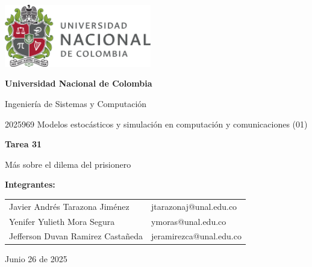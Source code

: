 \documentclass{article}
\begin{document}
\begin{titlepage}
    \centering
    \includegraphics[width=0.48\textwidth]{diagrams/logo_universidad.png}
    \par\vspace{2cm}

    {\Large \textbf{Universidad Nacional de Colombia} \par}
    \vspace{0.5cm}
    {\large Ingeniería de Sistemas y Computación \par}
    {\large 2025969 Modelos estocásticos y simulación en computación y comunicaciones (01)\par}
    \vspace{3cm}

    {\large \textbf{Tarea 31} \par}
    {\large Más sobre el dilema del prisionero\par}
    \vspace{3cm}

    {\large \textbf{Integrantes:} \par}
    \vspace{0.5cm}
    \begin{tabular}{ll}
    Javier Andrés Tarazona Jiménez & jtarazonaj@unal.edu.co \\
    Yenifer Yulieth Mora Segura & ymoras@unal.edu.co \\
    Jefferson Duvan Ramirez Castañeda & jeramirezca@unal.edu.co \\
    \end{tabular}
    \par\vspace{3cm}

    {\large Junio 26 de 2025 \par}
\end{titlepage}

\tableofcontents %

\newpage %
\end{document}
